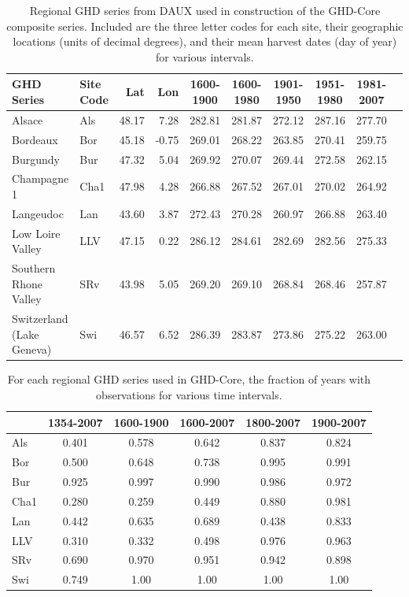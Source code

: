 \documentclass[12pt]{article}
\begin{document}
\begin{table}
\small
\caption{\small Regional GHD series from DAUX used in construction of the GHD-Core composite series. Included are the three letter codes for each site, their geographic locations (units of decimal degrees), and their mean harvest dates (day of year) for various intervals.}
\centering
\begin{tabular}{| l l | r r | c c c c c p{5cm} |}
\hline
 \bf GHD Series & \bf Site Code & \bf Lat & \bf Lon & \bf 1600-1900 & \bf 1600-1980 & \bf 1901-1950 & \bf 1951-1980 & \bf 1981-2007 \\
\hline
Alsace	& Als & 48.17 & 7.28 & 282.81 & 281.87 & 272.12 & 287.16	 & 277.70 \\
Bordeaux	& Bor	& 45.18 & -0.75	& 269.01 & 	268.22	&  263.85 &  270.41 &  259.75\\
Burgundy	& Bur	& 47.32	& 5.04	& 269.92	& 270.07	& 269.44	& 272.58	& 262.15\\
Champagne 1	& Cha1	& 47.98	& 4.28	& 266.88	& 267.52	& 267.01	& 270.02	& 264.92\\
Langeudoc & Lan	& 43.60 & 3.87	& 272.43 &	270.28	& 260.97	& 266.88	& 263.40\\
Low Loire Valley	& LLV	& 47.15	& 0.22	& 286.12	& 284.61	& 282.69	& 282.56	& 275.33\\
Southern Rhone Valley	& SRv	& 43.98	& 5.05	& 269.20	& 269.10	& 268.84	& 268.46	& 257.87\\
Switzerland (Lake Geneva)	& Swi	& 46.57	& 6.52	& 286.39	& 283.87	& 273.86	& 275.22	& 263.00\\
\hline
\end{tabular}
\end{table}

\begin{table}
\small
\caption{\small For each regional GHD series used in GHD-Core, the fraction of years with observations for various time intervals.}
\centering
\begin{tabular}{l c c c c c}
\hline
 & \bf 1354-2007 & \bf 1600-1900 & \bf 1600-2007 & \bf 1800-2007 & \bf 1900-2007\\
\hline
Als	& 0.401 & 0.578 & 0.642 & 0.837	 & 0.824\\
Bor	 & 0.500 & 0.648 & 0.738 & 0.995 & 0.991\\
Bur & 	0.925	& 0.997	& 0.990	& 0.986	& 0.972\\
Cha1	& 0.280	& 0.259	& 0.449	& 0.880	& 0.981\\
Lan	& 0.442 & 0.635	& 0.689	& 0.438	& 0.833\\
LLV	& 0.310	& 0.332	& 0.498	& 0.976	& 0.963\\
SRv	& 0.690	& 0.970	& 0.951	& 0.942	& 0.898\\
Swi 	& 0.749	& 1.00 & 1.00	& 1.00	& 1.00\\
\hline
\end{tabular}
\end{table}
\end{document}
